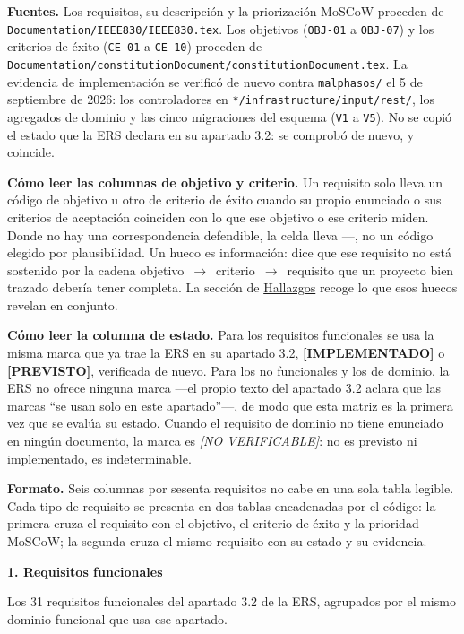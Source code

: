 \documentclass[12pt,varwidth=170mm,border=10pt]{standalone}
\newcommand{\sectiontitle}[1]{%
  \par\vspace{1.8ex}%
  {\normalfont\Large\bfseries #1\par}%
  \vspace{1.0ex}%
}
\newcommand{\ruta}[1]{\nolinkurl{#1}}
\newcommand{\estadoImplementado}{\textcolor{mainRed}{\textbf{[IMPLEMENTADO]}}}
\newcommand{\estadoPrevisto}{\textcolor{mainGray}{\textbf{[PREVISTO]}}}
\newcommand{\noVerificable}{\textcolor{mainGray}{\textit{[NO VERIFICABLE]}}}
\newcommand{\hueco}{---}
\begin{document}
\textbf{Fuentes.} Los requisitos, su descripción y la priorización MoSCoW proceden de \ruta{Documentation/IEEE830/IEEE830.tex}. Los objetivos (\texttt{OBJ-01} a \texttt{OBJ-07}) y los criterios de éxito (\texttt{CE-01} a \texttt{CE-10}) proceden de \ruta{Documentation/constitutionDocument/constitutionDocument.tex}. La evidencia de implementación se verificó de nuevo contra \ruta{malphasos/} el 5 de septiembre de 2026: los controladores en \ruta{*/infrastructure/input/rest/}, los agregados de dominio y las cinco migraciones del esquema (\texttt{V1} a \texttt{V5}). No se copió el estado que la ERS declara en su apartado 3.2: se comprobó de nuevo, y coincide.

\textbf{Cómo leer las columnas de objetivo y criterio.} Un requisito solo lleva un código de objetivo u otro de criterio de éxito cuando su propio enunciado o sus criterios de aceptación coinciden con lo que ese objetivo o ese criterio miden. Donde no hay una correspondencia defendible, la celda lleva \hueco{}, no un código elegido por plausibilidad. Un hueco es información: dice que ese requisito no está sostenido por la cadena objetivo~$\to$~criterio~$\to$~requisito que un proyecto bien trazado debería tener completa. La sección de \hyperref[sec:hallazgos]{Hallazgos} recoge lo que esos huecos revelan en conjunto.

\textbf{Cómo leer la columna de estado.} Para los requisitos funcionales se usa la misma marca que ya trae la ERS en su apartado 3.2, \estadoImplementado{} o \estadoPrevisto{}, verificada de nuevo. Para los no funcionales y los de dominio, la ERS no ofrece ninguna marca —el propio texto del apartado 3.2 aclara que las marcas ``se usan solo en este apartado''—, de modo que esta matriz es la primera vez que se evalúa su estado. Cuando el requisito de dominio no tiene enunciado en ningún documento, la marca es \noVerificable{}: no es previsto ni implementado, es indeterminable.

\textbf{Formato.} Seis columnas por sesenta requisitos no cabe en una sola tabla legible. Cada tipo de requisito se presenta en dos tablas encadenadas por el código: la primera cruza el requisito con el objetivo, el criterio de éxito y la prioridad MoSCoW; la segunda cruza el mismo requisito con su estado y su evidencia.

\sectiontitle{1. Requisitos funcionales}

Los 31 requisitos funcionales del apartado 3.2 de la ERS, agrupados por el mismo dominio funcional que usa ese apartado.
\end{document}
